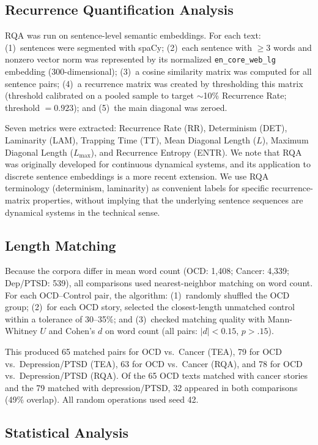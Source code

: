\documentclass[11pt,a4paper]{article}
\begin{document}
\subsection{Recurrence Quantification Analysis}

RQA was run on sentence-level semantic embeddings. For each text: (1)~sentences were segmented with spaCy; (2)~each sentence with $\geq$3 words and nonzero vector norm was represented by its normalized \texttt{en\_core\_web\_lg} embedding (300-dimensional); (3)~a cosine similarity matrix was computed for all sentence pairs; (4)~a recurrence matrix was created by thresholding this matrix (threshold calibrated on a pooled sample to target $\sim$10\% Recurrence Rate; threshold $= 0.923$); and (5)~the main diagonal was zeroed.

Seven metrics were extracted: Recurrence Rate (RR), Determinism (DET), Laminarity (LAM), Trapping Time (TT), Mean Diagonal Length ($L$), Maximum Diagonal Length ($L_\mathrm{max}$), and Recurrence Entropy (ENTR). We note that RQA was originally developed for continuous dynamical systems, and its application to discrete sentence embeddings is a more recent extension. We use RQA terminology (determinism, laminarity) as convenient labels for specific recurrence-matrix properties, without implying that the underlying sentence sequences are dynamical systems in the technical sense.

\subsection{Length Matching}\label{sec:matching}

Because the corpora differ in mean word count (OCD: 1,408; Cancer: 4,339; Dep/PTSD: 539), all comparisons used nearest-neighbor matching on word count. For each OCD--Control pair, the algorithm: (1)~randomly shuffled the OCD group; (2)~for each OCD story, selected the closest-length unmatched control within a tolerance of 30--35\%; and (3)~checked matching quality with Mann-Whitney $U$ and Cohen's $d$ on word count (all pairs: $|d| < 0.15$, $p > .15$).

This produced 65 matched pairs for OCD vs.\ Cancer (TEA), 79 for OCD vs.\ Depression/PTSD (TEA), 63 for OCD vs.\ Cancer (RQA), and 78 for OCD vs.\ Depression/PTSD (RQA). Of the 65 OCD texts matched with cancer stories and the 79 matched with depression/PTSD, 32 appeared in both comparisons (49\% overlap). All random operations used seed 42.

\subsection{Statistical Analysis}
\end{document}

